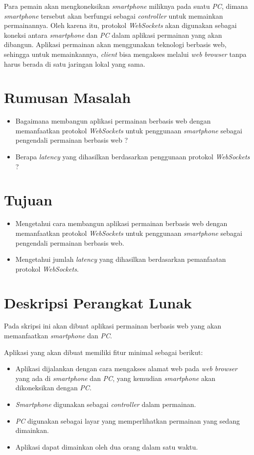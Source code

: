 \documentclass[a4paper,twoside]{article}
\begin{document}
Para pemain akan mengkoneksikan \textit{smartphone} miliknya pada suatu \textit{PC}, dimana \textit{smartphone} tersebut akan berfungsi sebagai \textit{controller} untuk memainkan permainannya. Oleh karena itu, protokol \textit{WebSockets} akan digunakan sebagai koneksi antara \textit{smartphone} dan \textit{PC} dalam aplikasi permainan yang akan dibangun. Aplikasi permainan akan menggunakan teknologi berbasis web, sehingga untuk memainkannya, \textit{client} bisa mengakses melalui \textit{web browser} tanpa harus berada di satu jaringan lokal yang sama.

\section{Rumusan Masalah}

\begin{itemize}
	\item Bagaimana membangun aplikasi permainan berbasis web dengan memanfaatkan protokol \textit{WebSockets} untuk penggunaan \textit{smartphone} sebagai pengendali permainan berbasis web ?
	\item Berapa \textit{latency} yang dihasilkan berdasarkan penggunaan protokol \textit{WebSockets} ? 
\end{itemize}

\section{Tujuan}

\begin{itemize}
	\item Mengetahui cara membangun aplikasi permainan berbasis web dengan memanfaatkan protokol \textit{WebSockets} untuk penggunaan \textit{smartphone} sebagai pengendali permainan berbasis web.
	\item Mengetahui jumlah \textit{latency} yang dihasilkan berdasarkan pemanfaatan protokol \textit{WebSockets}.
\end{itemize}

\section{Deskripsi Perangkat Lunak}

Pada skripsi ini akan dibuat aplikasi permainan berbasis web yang akan memanfaatkan \textit{smartphone} dan \textit{PC}.

Aplikasi yang akan dibuat memiliki fitur minimal sebagai berikut:
\begin{itemize}
	\item Aplikasi dijalankan dengan cara mengakses alamat web pada \textit{web browser} yang ada di \textit{smartphone} dan \textit{PC}, yang kemudian \textit{smartphone} akan dikoneksikan dengan \textit{PC}.
	\item \textit{Smartphone} digunakan sebagai \textit{controller} dalam permainan.
	\item \textit{PC} digunakan sebagai layar yang memperlihatkan permainan yang sedang dimainkan.
	\item Aplikasi dapat dimainkan oleh dua orang dalam satu waktu.
\end{itemize}
\end{document}
